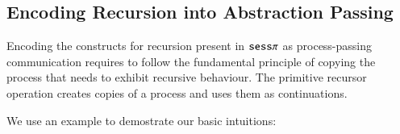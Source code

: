 

\subsection{Encoding Recursion into Abstraction Passing}

Encoding the constructs for recursion present in $\mathtt{sess}\pi$ as process-passing
communication requires to follow the fundamental
principle of copying the process that needs to exhibit recursive behaviour.
The primitive recursor operation creates copies of a process and uses them
as continuations.

We use an example to demostrate our basic intuitions:
%
